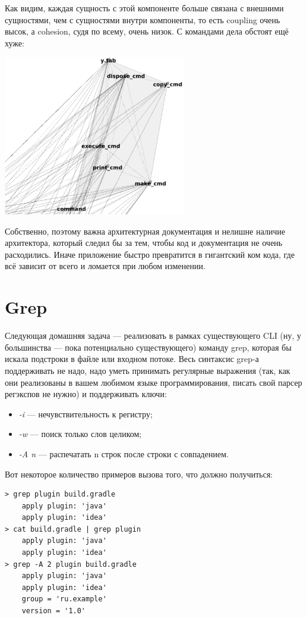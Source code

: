 \documentclass[a5paper]{article}
\begin{document}
Как видим, каждая сущность с этой компоненте больше связана с внешними сущностями, чем с сущностями внутри компоненты, то есть coupling очень высок, а cohesion, судя по всему, очень низок. С командами дела обстоят ещё хуже:

\begin{center}
	\includegraphics[width=0.6\textwidth]{bashCommands.png}
\end{center}

Собственно, поэтому важна архитектурная документация и нелишне наличие архитектора, который следил бы за тем, чтобы код и документация не очень расходились. Иначе приложение быстро превратится в гигантский ком кода, где всё зависит от всего и ломается при любом изменении.

\section{Grep}

Следующая домашняя задача --- реализовать в рамках существующего CLI (ну, у большинства --- пока потенциально существующего) команду grep, которая бы искала подстроки в файле или входном потоке. Весь синтаксис grep-а поддерживать не надо, надо уметь принимать регулярные выражения (так, как они реализованы в вашем любимом языке программирования, писать свой парсер регэкспов не нужно) и поддерживать ключи:

\begin{itemize}
	\item \textit{-i} --- нечувствительность к регистру;
	\item \textit{-w}  --- поиск только слов целиком;
	\item \textit{-A n} --- распечатать n строк после строки с совпадением.
\end{itemize}

Вот некоторое количество примеров вызова того, что должно получиться:
\begin{verbatim}
> grep plugin build.gradle
    apply plugin: 'java'
    apply plugin: 'idea'
> cat build.gradle | grep plugin
    apply plugin: 'java'
    apply plugin: 'idea'
> grep -A 2 plugin build.gradle
    apply plugin: 'java'
    apply plugin: 'idea'
    group = 'ru.example'
    version = '1.0'
\end{verbatim}
\end{document}
